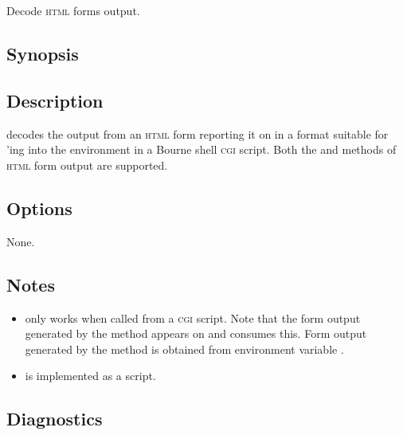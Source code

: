 \newpage
\section{}
\label{parseform}

Decode \textsc{html} forms output.

\subsection*{Synopsis}
 
\begin{synopsis}
\end{synopsis}
 
\subsection*{Description}
 
 decodes the output from an \textsc{html} form reporting it on
 in a format suitable for 'ing into the environment
in a Bourne shell \textsc{cgi} script.  Both the  and 
methods of \textsc{html} form output are supported.
 
\subsection*{Options}
 
None.
 
\subsection*{Notes}
 
\begin{itemize}
\item
    only works when called from a \textsc{cgi} script.  Note
   that the form output generated by the  method appears on
    and  consumes this.  Form output generated by
   the  method is obtained from environment variable
   .

\item
    is implemented as a  script.
\end{itemize}
 
\subsection*{Diagnostics}
 
